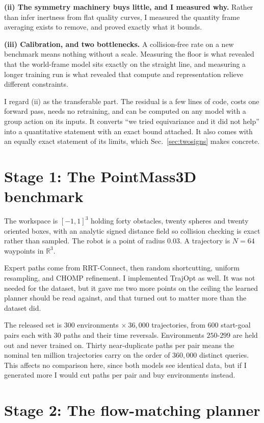 \documentclass[11pt,a4paper]{article}
\begin{document}
\textbf{(ii) The symmetry machinery buys little, and I measured why.} Rather
than infer inertness from flat quality curves, I measured the quantity frame averaging
exists to remove, and proved exactly what it bounds.

\textbf{(iii) Calibration, and two bottlenecks.} A collision-free rate on a new
benchmark means nothing without a scale. Measuring the floor is what revealed
that the world-frame model sits exactly on the straight line, and measuring a
longer training run is what revealed that compute and representation relieve
different constraints.

I regard (ii) as the transferable part. The residual is a few lines of code,
costs one forward pass, needs no retraining, and can be computed on any model
with a group action on its inputs. It converts ``we tried equivariance and it did
not help'' into a quantitative statement with an exact bound attached. It also
comes with an equally exact statement of its limits, which
Sec.~\ref{sec:twosigns} makes concrete.

\section{Stage 1: The PointMass3D benchmark}
\label{sec:benchmark}

The workspace is $[-1,1]^3$ holding forty obstacles, twenty spheres and twenty
oriented boxes, with an analytic signed distance field so collision checking is
exact rather than sampled. The robot is a point of radius $0.03$. A trajectory is
$N=64$ waypoints in $\mathbb{R}^3$.

Expert paths come from RRT-Connect, then random shortcutting, uniform
resampling, and CHOMP refinement. I implemented TrajOpt as well. It was not
needed for the dataset, but it gave me two more points on the ceiling the learned
planner should be read against, and that turned out to matter more than the
dataset did.

The released set is $300$ environments $\times\ 36{,}000$ trajectories, from
$600$ start-goal pairs each with $30$ paths and their time reversals.
Environments $250$-$299$ are held out and never trained on. Thirty
near-duplicate paths per pair means the nominal ten million trajectories carry on
the order of $360{,}000$ distinct queries. This affects no comparison here, since
both models see identical data, but if I generated more I would cut paths per pair
and buy environments instead.

\section{Stage 2: The flow-matching planner}
\label{sec:planner}
\end{document}
